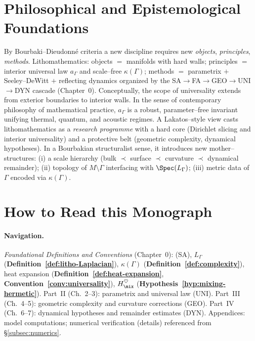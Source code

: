 \medskip

\section{Philosophical and Epistemological Foundations}\label{sec:foundations}

By Bourbaki–Dieudonné criteria a new discipline requires new \emph{objects}, \emph{principles}, \emph{methods}.
Lithomathematics: objects $=$ manifolds with hard walls; principles $=$ interior universal law $a_\Gamma$ and scale–free $\kappa(\Gamma)$; methods $=$ parametrix $+$ Seeley–DeWitt $+$ reflecting dynamics organized by the SA$\to$FA$\to$GEO$\to$UNI$\to$DYN cascade (Chapter~0).
Conceptually, the scope of universality extends from exterior boundaries to interior walls.
In the sense of contemporary philosophy of mathematical practice, $a_\Gamma$ is a robust, parameter–free invariant unifying thermal, quantum, and acoustic regimes.
A Lakatos–style view casts lithomathematics as a \emph{research programme} with a hard core (Dirichlet slicing and interior universality) and a protective belt (geometric complexity, dynamical hypotheses).
In a Bourbakian structuralist sense, it introduces new mother–structures: (i) a scale hierarchy (bulk $\prec$ surface $\prec$ curvature $\prec$ dynamical remainder); (ii) topology of $M\setminus\Gamma$ interfacing with $\Spec(L_\Gamma)$; (iii) metric data of $\Gamma$ encoded via $\kappa(\Gamma)$.

\medskip

\section{How to Read this Monograph}\label{sec:howto}

\paragraph{Navigation.}
\emph{Foundational Definitions and Conventions} (Chapter~0): (SA), $L_\Gamma$ (\textbf{Definition~\ref{def:litho-Laplacian}}), $\kappa(\Gamma)$ (\textbf{Definition~\ref{def:complexity}}), heat expansion (\textbf{Definition~\ref{def:heat-expansion}}, \textbf{Convention~\ref{conv:universality}}), $H_{\mix}^{\heartsuit}$ (\textbf{Hypothesis~\ref{hyp:mixing-hermetic}}).
Part~II (Ch.~2–3): parametrix and universal law (UNI).
Part~III (Ch.~4–5): geometric complexity and curvature corrections (GEO).
Part~IV (Ch.~6–7): dynamical hypotheses and remainder estimates (DYN).
Appendices: model computations; numerical verification (details) referenced from §\ref{subsec:numerics}.

